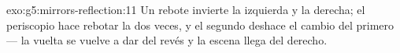 \begin{solution}{exo:g5:mirrors-reflection:11}
Un rebote invierte la izquierda y la derecha; el periscopio hace
rebotar la  dos veces, y el segundo  deshace el cambio
del primero --- la vuelta se vuelve a dar del revés y la escena llega
del derecho.
\end{solution}
